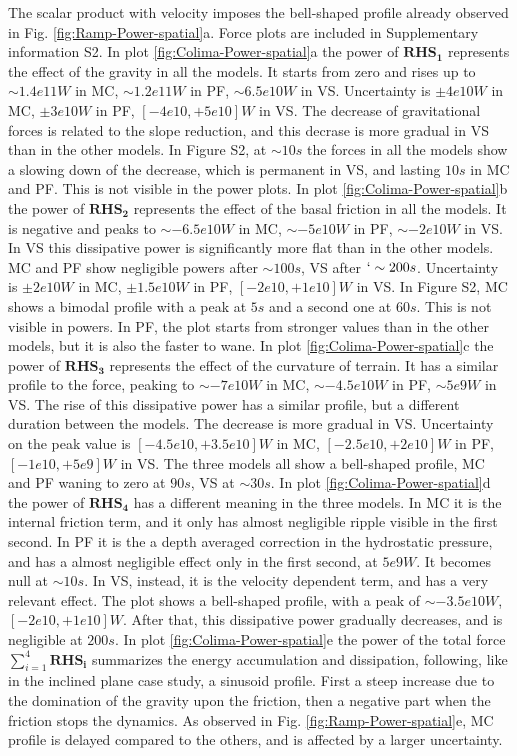 \documentclass{article}
\begin{document}
The scalar product with velocity imposes the bell-shaped profile already observed in Fig. \ref{fig:Ramp-Power-spatial}a. Force plots are included in Supplementary information S2. In plot \ref{fig:Colima-Power-spatial}a the power of $\boldsymbol{RHS_1}$ represents the effect of the gravity in all the models. It starts from zero and rises up to $\sim 1.4e11 W$ in MC, $\sim 1.2e11 W$ in PF, $\sim 6.5e10 W$ in VS. Uncertainty is $\pm 4e10 W$ in MC, $\pm 3e10 W$ in PF, $[-4e10,+5e10] W$ in VS. The decrease of gravitational forces is related to the slope reduction, and this decrase is more gradual in VS than in the other models. In Figure S2, at $\sim 10 s$ the forces in all the models show a slowing down of the decrease, which is permanent in VS, and lasting $10 s$ in MC and PF. This is not visible in the power plots. In plot \ref{fig:Colima-Power-spatial}b the power of  $\boldsymbol{RHS_2}$ represents the effect of the basal friction in all the models. It is negative and peaks to $\sim -6.5e10 W$ in MC, $\sim -5e10 W$ in PF, $\sim -2e10 W$ in VS. In VS this dissipative power is significantly more flat than in the other models. MC and PF show negligible powers after $\sim 100 s$, VS after $`\sim 200 s$. Uncertainty is $\pm 2e10 W$ in MC, $\pm 1.5e10 W$ in PF, $[-2e10,+1e10] W$ in VS. In Figure S2, MC shows a bimodal profile with a peak at $5 s$ and a second one at $60 s$. This is not visible in powers. In PF, the plot starts from stronger values than in the other models, but it is also the faster to wane. In plot \ref{fig:Colima-Power-spatial}c the power of $\boldsymbol{RHS_3}$ represents the effect of the curvature of terrain. It has a similar profile to the force, peaking to $\sim -7e10 W$ in MC, $\sim -4.5e10 W$ in PF, $\sim 5e9 W$ in VS. The rise of this dissipative power has a similar profile, but a different duration between the models. The decrease is more gradual in VS. Uncertainty on the peak value is $[-4.5e10,+3.5e10] W$ in MC, $[-2.5e10,+2e10] W$ in PF, $[-1e10,+5e9] W$ in VS. The three models all show a bell-shaped profile, MC and PF waning to zero at $90 s$, VS at $\sim 30 s$. In plot \ref{fig:Colima-Power-spatial}d the power of $\boldsymbol{RHS_4}$ has a different meaning in the three models. In MC it is the internal friction term, and it only has almost negligible ripple visible in the first second. In PF it is the a depth averaged correction in the hydrostatic pressure, and has a almost negligible effect only in the first second, at $5e9 W$. It becomes null at $\sim 10 s$. In VS, instead, it is the velocity dependent term, and has a very relevant effect. The plot shows a bell-shaped profile, with a peak of $\sim -3.5e10 W$, $[-2e10,+1e10] W$. After that, this dissipative power gradually decreases, and is negligible at $200 s$. In plot \ref{fig:Colima-Power-spatial}e the power of the total force $\sum^4_{i=1}\boldsymbol{RHS_i}$ summarizes the energy accumulation and dissipation, following, like in the inclined plane case study, a sinusoid profile. First a steep increase due to the domination of the gravity upon the friction, then a negative part when the friction stops the dynamics. As observed in Fig. \ref{fig:Ramp-Power-spatial}e, MC profile is delayed compared to the others, and is affected by a larger uncertainty.
\end{document}
